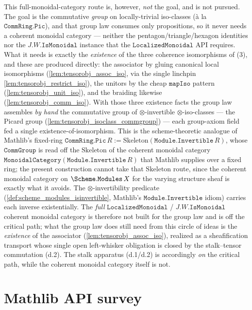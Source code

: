 This full-monoidal-category route is, however, \emph{not} the goal, and is not
pursued. The goal is the commutative \emph{group} on locally-trivial iso-classes
(à la \(\mathtt{CommRing.Pic}\)), and that group law consumes only propositions, so
it never needs a coherent monoidal category --- neither the
pentagon/triangle/hexagon identities nor the \(J.W.\mathtt{IsMonoidal}\) instance
that the \(\mathtt{LocalizedMonoidal}\) API requires. What it needs is exactly the
\emph{existence} of the three coherence isomorphisms of (3), and these are produced
directly: the associator by gluing canonical local isomorphisms
(\cref{lem:tensorobj_assoc_iso}, via the single linchpin
\cref{lem:tensorobj_restrict_iso}), the unitors by the cheap \(\mathtt{mapIso}\)
pattern (\cref{lem:tensorobj_unit_iso}), and the braiding likewise
(\cref{lem:tensorobj_comm_iso}). With those three existence facts the group law
assembles \emph{by hand} the commutative group of \(\otimes\)-invertible
\(\otimes\)-iso-classes --- the Picard group
(\cref{lem:tensorobj_isoclass_commgroup}) --- each group-axiom field fed a single
existence-of-isomorphism. This is the scheme-theoretic analogue of Mathlib's
fixed-ring \(\mathtt{CommRing.Pic}\,R := \mathrm{Skeleton}(\mathtt{Module.Invertible}\,R)\),
whose \(\mathtt{CommGroup}\) is read off the \(\mathrm{Skeleton}\) of the coherent
monoidal category \(\mathtt{MonoidalCategory}(\mathtt{Module.Invertible}\,R)\) that
Mathlib supplies over a fixed ring; the present construction cannot take that
\(\mathrm{Skeleton}\) route, since the coherent monoidal category on
\(\Scheme.\mathtt{Modules}\,X\) for the varying structure sheaf is exactly what it
avoids. The
\(\otimes\)-invertibility predicate (\cref{def:scheme_modules_isinvertible},
Mathlib's \(\mathtt{Module.Invertible}\) idiom) carries each inverse existentially.
The \emph{full} \(\mathtt{LocalizedMonoidal}\) / \(J.W.\mathtt{IsMonoidal}\) coherent
monoidal category is therefore not built for the group law and is off the critical
path; what the group law does still need from this circle of ideas is the
\emph{existence} of the associator (\cref{lem:tensorobj_assoc_iso}), realized as a
sheafification transport whose single open left-whisker obligation is closed by the
stalk--tensor commutation (d.2). The stalk apparatus (d.1/d.2) is accordingly
\emph{on} the critical path, while the coherent monoidal category itself is not.

\section{Mathlib API survey}
\label{sec:tensorobj_api_survey}

